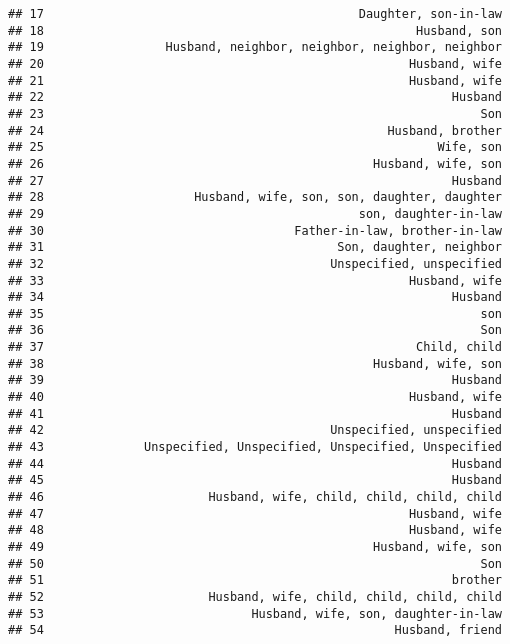 \documentclass[
]{article}
\begin{document}
\begin{verbatim}
## 17                                            Daughter, son-in-law
## 18                                                    Husband, son
## 19                 Husband, neighbor, neighbor, neighbor, neighbor
## 20                                                   Husband, wife
## 21                                                   Husband, wife
## 22                                                         Husband
## 23                                                             Son
## 24                                                Husband, brother
## 25                                                       Wife, son
## 26                                              Husband, wife, son
## 27                                                         Husband
## 28                     Husband, wife, son, son, daughter, daughter
## 29                                            son, daughter-in-law
## 30                                   Father-in-law, brother-in-law
## 31                                         Son, daughter, neighbor
## 32                                        Unspecified, unspecified
## 33                                                   Husband, wife
## 34                                                         Husband
## 35                                                             son
## 36                                                             Son
## 37                                                    Child, child
## 38                                              Husband, wife, son
## 39                                                         Husband
## 40                                                   Husband, wife
## 41                                                         Husband
## 42                                        Unspecified, unspecified
## 43              Unspecified, Unspecified, Unspecified, Unspecified
## 44                                                         Husband
## 45                                                         Husband
## 46                       Husband, wife, child, child, child, child
## 47                                                   Husband, wife
## 48                                                   Husband, wife
## 49                                              Husband, wife, son
## 50                                                             Son
## 51                                                         brother
## 52                       Husband, wife, child, child, child, child
## 53                             Husband, wife, son, daughter-in-law
## 54                                                 Husband, friend

\end{verbatim}
\end{document}
